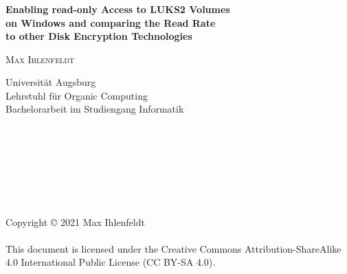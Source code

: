 \begin{verbatim}










\end{verbatim}

\begin{center}
	\huge{\textbf{\titleDocument}}
\end{center}

\begin{center}
	\Large{\textbf{Enabling read-only Access to LUKS2 Volumes\\on Windows and comparing the Read Rate\\to other Disk Encryption Technologies}}
\end{center}

\vspace{.5em}
\begin{center}
	\large{\textsc{Max Ihlenfeldt}}
\end{center}

\begin{center}
	\large{
		Universität Augsburg \\
		Lehrstuhl für Organic Computing \\
		Bachelorarbeit im Studiengang Informatik
	}
\end{center}

\begin{verbatim}








\end{verbatim}

\begin{center}
	\large{
		Copyright \copyright{} 2021 Max Ihlenfeldt \\
		\phantom{} \\
		This document is licensed under the Creative Commons Attribution-ShareAlike 4.0 International Public License (CC BY-SA 4.0).
	}
\end{center}
